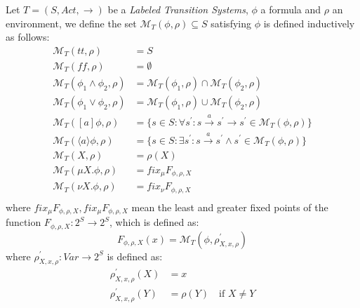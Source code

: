 Let $T = (S, Act, \rightarrow)$ be a \emph{Labeled Transition
  Systems}, $\phi$ a formula and $\rho$ an environment, we define the
set $\mathcal{M}_T(\phi, \rho) \subseteq S$ satisfying $\phi$ is
defined inductively as follows:
\begin{displaymath}
  \begin{split}
    \mathcal{M}_T(tt, \rho) &= S \\
    \mathcal{M}_T(ff, \rho) &= \emptyset \\
    \mathcal{M}_T(\phi_1 \wedge \phi_2, \rho) &=
    \mathcal{M}_T(\phi_1, \rho) \cap     \mathcal{M}_T(\phi_2, \rho)\\
    \mathcal{M}_T(\phi_1 \vee \phi_2, \rho) &=
    \mathcal{M}_T(\phi_1, \rho) \cup     \mathcal{M}_T(\phi_2, \rho)\\
    \mathcal{M}_T([a]\phi, \rho) &= \{ s\in S: \forall s^{\prime}: s
    \xrightarrow{a} s^{\prime} \rightarrow s^{\prime} \in
    \mathcal{M}_T(\phi, \rho)\} \\
    \mathcal{M}_T(\langle a \rangle \phi, \rho) &= \{ s\in S: \exists
    s^{\prime}: s \xrightarrow{a} s^{\prime} \wedge s^{\prime} \in
    \mathcal{M}_T(\phi, \rho)\} \\
    \mathcal{M}_T(X, \rho) &= \rho(X) \\
    \mathcal{M}_T(\mu X.\phi, \rho) &= fix_{\mu}F_{\phi, \rho, X} \\
    \mathcal{M}_T(\nu X.\phi, \rho) &= fix_{\nu}F_{\phi, \rho, X} \\
  \end{split}
\end{displaymath}
where $fix_{\mu}F_{\phi, \rho, X}, fix_{\mu}F_{\phi, \rho, X}$ mean
the least and greater fixed points of the function $F_{\phi, \rho, X}:
2^S \rightarrow 2^S$, which is defined as:
\begin{displaymath}
  F_{\phi, \rho, X}(x) = \mathcal{M}_T(\phi, \rho_{X, x, \rho}^{\prime})
\end{displaymath}
where $\rho_{X, x, \rho}^{\prime}: Var \rightarrow 2^S$ is defined as:
\begin{displaymath}
  \begin{split}
    \rho_{X, x, \rho}^{\prime}(X) &= x \\
    \rho_{X, x, \rho}^{\prime}(Y) &= \rho(Y) \quad \text{if } X\not=Y\\
  \end{split}
\end{displaymath}





